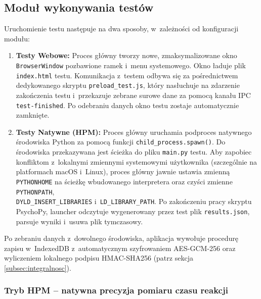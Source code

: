 \documentclass[12pt, a4paper, oneside]{report}
\begin{document}
\subsection{Moduł wykonywania testów}
\label{subsec:impl-testy}

Uruchomienie testu następuje na dwa sposoby, w~zależności od konfiguracji modułu:
\begin{enumerate}
	\item \textbf{Testy Webowe:} Proces główny tworzy nowe, zmaksymalizowane okno \\ \texttt{BrowserWindow} pozbawione ramek i~menu systemowego. Okno ładuje plik \texttt{index.html} testu. Komunikacja z~testem odbywa się za pośrednictwem dedykowanego skryptu \texttt{preload\_test.js}, który nasłuchuje na zdarzenie zakończenia testu i~przekazuje zebrane surowe dane za pomocą kanału IPC \texttt{test-finished}. Po odebraniu danych okno testu zostaje automatycznie zamknięte.
	\item \textbf{Testy Natywne (HPM):} Proces główny uruchamia podproces natywnego środowiska Python za pomocą funkcji \texttt{child\_process.spawn()}. Do środowiska przekazywana jest ścieżka do pliku \texttt{main.py} testu. Aby zapobiec konfliktom z~lokalnymi zmiennymi systemowymi użytkownika (szczególnie na platformach macOS i~Linux), proces główny jawnie ustawia zmienną \texttt{PYTHONHOME} na ścieżkę wbudowanego interpretera oraz czyści zmienne \texttt{PYTHONPATH}, \\ \texttt{DYLD\_INSERT\_LIBRARIES} i~\texttt{LD\_LIBRARY\_PATH}. Po zakończeniu pracy skryptu PsychoPy, launcher odczytuje wygenerowany przez test plik \texttt{results.json}, parsuje wyniki i~usuwa plik tymczasowy.
\end{enumerate}

Po zebraniu danych z~dowolnego środowiska, aplikacja wywołuje procedurę zapisu w~IndexedDB z~automatycznym szyfrowaniem AES-GCM-256 oraz wyliczeniem lokalnego podpisu HMAC-SHA256 (patrz sekcja \ref{subsec:integralnosc}).

\subsubsection{Tryb HPM -- natywna precyzja pomiaru czasu reakcji}
\label{subsec:hpm}
\end{document}
